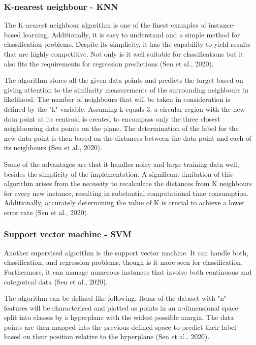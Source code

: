 \subsubsection{K-nearest neighbour - KNN}
The K-nearest neighbour algorithm is one of the finest examples of instance-based learning. Additionally, it is easy to understand and a simple method for classification problems. Despite its simplicity, it has the capability to yield results that are highly competitive. Not only is it well suitable for classifications but it also fits the requirements for regression predictions (Sen et al., 2020).

The algorithm stores all the given data points and predicts the target based on giving attention to the similarity measurements of the surrounding neighbours in likelihood. The number of neighbours that will be taken in consideration is defined by the "k" variable. Assuming k equals 3, a circular region with the new data point at its centroid is created to encompass only the three closest neighbouring data points on the plane. The determination of the label for the new data point is then based on the distances between the data point and each of its neighbours (Sen et al., 2020).

Some of the advantages are that it handles noisy and large training data well, besides the simplicity of the implementation. A significant limitation of this algorithm arises from the necessity to recalculate the distances from K neighbours for every new instance, resulting in substantial computational time consumption. Additionally, accurately determining the value of K is crucial to achieve a lower error rate (Sen et al., 2020).

\subsubsection{Support vector machine - SVM}
Another supervised algorithm is the support vector machine. It can handle both, classification, and regression problems, though is it more seen for classification. Furthermore, it can manage numerous instances that involve both continuous and categorical data (Sen et al., 2020).

The algorithm can be defined like following. Items of the dataset with "n" features will be characterised and plotted as points in an n-dimensional space split into classes by a hyperplane with the widest possible margin. The data points are then mapped into the previous defined space to predict their label based on their position relative to the hyperplane (Sen et al., 2020).

